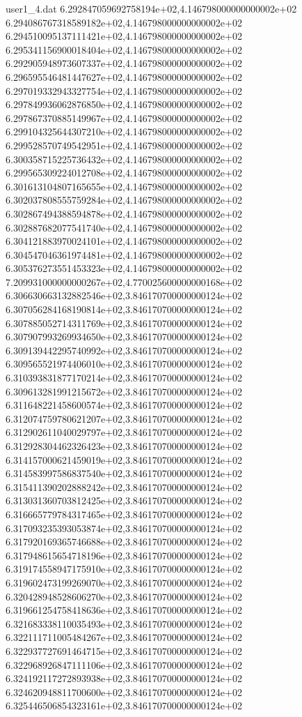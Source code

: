 \begin{filecontents}{user1_4.dat}
6.292847059692758194e+02,4.146798000000000002e+02
6.294086767318589182e+02,4.146798000000000002e+02
6.294510095137111421e+02,4.146798000000000002e+02
6.295341156900018404e+02,4.146798000000000002e+02
6.292905948973607337e+02,4.146798000000000002e+02
6.296595546481447627e+02,4.146798000000000002e+02
6.297019332943327754e+02,4.146798000000000002e+02
6.297849936062876850e+02,4.146798000000000002e+02
6.297867370885149967e+02,4.146798000000000002e+02
6.299104325644307210e+02,4.146798000000000002e+02
6.299528570749542951e+02,4.146798000000000002e+02
6.300358715225736432e+02,4.146798000000000002e+02
6.299565309224012708e+02,4.146798000000000002e+02
6.301613104807165655e+02,4.146798000000000002e+02
6.302037808555759284e+02,4.146798000000000002e+02
6.302867494388594878e+02,4.146798000000000002e+02
6.302887682077541740e+02,4.146798000000000002e+02
6.304121883970024101e+02,4.146798000000000002e+02
6.304547046361974481e+02,4.146798000000000002e+02
6.305376273551453323e+02,4.146798000000000002e+02
7.209931000000000267e+02,4.770025600000000168e+02
6.306630663132882546e+02,3.846170700000000124e+02
6.307056284168190814e+02,3.846170700000000124e+02
6.307885052714311769e+02,3.846170700000000124e+02
6.307907993269934650e+02,3.846170700000000124e+02
6.309139442295740992e+02,3.846170700000000124e+02
6.309565521974406010e+02,3.846170700000000124e+02
6.310393831877170214e+02,3.846170700000000124e+02
6.309613281991215672e+02,3.846170700000000124e+02
6.311648221458600574e+02,3.846170700000000124e+02
6.312074759780621207e+02,3.846170700000000124e+02
6.312902611040029797e+02,3.846170700000000124e+02
6.312928304462326423e+02,3.846170700000000124e+02
6.314157000621459019e+02,3.846170700000000124e+02
6.314583997586837540e+02,3.846170700000000124e+02
6.315411390202888242e+02,3.846170700000000124e+02
6.313031360703812425e+02,3.846170700000000124e+02
6.316665779784317465e+02,3.846170700000000124e+02
6.317093235393053874e+02,3.846170700000000124e+02
6.317920169365746688e+02,3.846170700000000124e+02
6.317948615654718196e+02,3.846170700000000124e+02
6.319174558947175910e+02,3.846170700000000124e+02
6.319602473199269070e+02,3.846170700000000124e+02
6.320428948528606270e+02,3.846170700000000124e+02
6.319661254758418636e+02,3.846170700000000124e+02
6.321683338110035493e+02,3.846170700000000124e+02
6.322111711005484267e+02,3.846170700000000124e+02
6.322937727691464715e+02,3.846170700000000124e+02
6.322968926847111106e+02,3.846170700000000124e+02
6.324192117272893938e+02,3.846170700000000124e+02
6.324620948811700600e+02,3.846170700000000124e+02
6.325446506854323161e+02,3.846170700000000124e+02

\end{filecontents}
